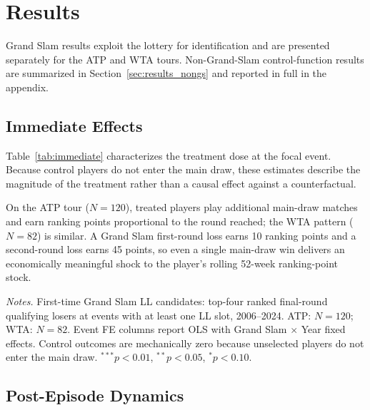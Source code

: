 \section{Results}
\label{sec:results}

Grand Slam results exploit the lottery for identification and are presented separately for the ATP and WTA tours. Non-Grand-Slam control-function results are summarized in Section~\ref{sec:results_nongs} and reported in full in the appendix.

\subsection{Immediate Effects}
\label{sec:results_immediate}

Table~\ref{tab:immediate} characterizes the treatment dose at the focal event. Because control players do not enter the main draw, these estimates describe the magnitude of the treatment rather than a causal effect against a counterfactual.

On the ATP tour ($N = 120$), treated players play additional main-draw matches and earn ranking points proportional to the round reached; the WTA pattern ($N = 82$) is similar. A Grand Slam first-round loss earns 10 ranking points and a second-round loss earns 45 points, so even a single main-draw win delivers an economically meaningful shock to the player's rolling 52-week ranking-point stock.

\begin{table}[htbp]
\centering
\caption{Grand Slam Lottery: Immediate Event-Level Effects}
\label{tab:immediate}
\begin{threeparttable}
\small

\begin{tablenotes}
\footnotesize
\item \textit{Notes.} First-time Grand Slam LL candidates: top-four ranked final-round qualifying losers at events with at least one LL slot, 2006--2024. ATP: $N = 120$; WTA: $N = 82$. Event FE columns report OLS with Grand Slam $\times$ Year fixed effects. Control outcomes are mechanically zero because unselected players do not enter the main draw. $^{***}p<0.01$, $^{**}p<0.05$, $^{*}p<0.10$.
\end{tablenotes}
\end{threeparttable}
\end{table}

\subsection{Post-Episode Dynamics}
\label{sec:results_dynamics}

